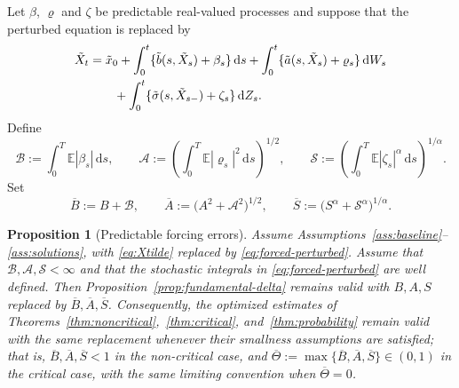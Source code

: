 \documentclass[10pt,a4paper]{amsart}
\newtheorem{proposition}[theorem]{Proposition}
\newcommand{\E}{\mathbb{E}}
\newcommand{\1}{\mathbf{1}}
\newcommand{\dd}{\,\mathrm{d}}
\newcommand{\wt}{\tilde}
\begin{document}
Let $\beta$, $\varrho$ and $\zeta$ be predictable real-valued processes and suppose that the perturbed equation is replaced by
\begin{align}
\wt X_t
&=\wt x_0+\int_0^t\{\wt b(s,\wt X_s)+\beta_s\}\dd s
+\int_0^t\{\wt a(s,\wt X_s)+\varrho_s\}\dd W_s \notag\\
&\qquad +\int_0^t\{\wt\sigma(s,\wt X_{s-})+\zeta_s\}\dd Z_s.
\label{eq:forced-perturbed}
\end{align}
Define
\[
  \mathcal B:=\int_0^T\E|\beta_s|\dd s,
  \qquad
  \mathcal A:=\left(\int_0^T\E|\varrho_s|^2\dd s\right)^{1/2},
  \qquad
  \mathcal S:=\left(\int_0^T\E|\zeta_s|^\alpha\dd s\right)^{1/\alpha}.
\]
Set
\[
  \overline B:=B+\mathcal B,
  \qquad
  \overline A:=\bigl(A^2+\mathcal A^2\bigr)^{1/2},
  \qquad
  \overline S:=\bigl(S^\alpha+\mathcal S^\alpha\bigr)^{1/\alpha}.
\]

\begin{proposition}[Predictable forcing errors]\label{prop:forcing}
Assume Assumptions~\ref{ass:baseline}--\ref{ass:solutions}, with \eqref{eq:Xtilde} replaced by \eqref{eq:forced-perturbed}. Assume that $\mathcal B,\mathcal A,\mathcal S<\infty$ and that the stochastic integrals in \eqref{eq:forced-perturbed} are well defined. Then Proposition~\ref{prop:fundamental-delta} remains valid with $B,A,S$ replaced by $\overline B,\overline A,\overline S$. Consequently, the optimized estimates of Theorems~\ref{thm:noncritical},~\ref{thm:critical}, and~\ref{thm:probability} remain valid with the same replacement whenever their smallness assumptions are satisfied; that is, $\overline B,\overline A,\overline S<1$ in the non-critical case, and $\overline\Theta:=\max\{\overline B,\overline A,\overline S\}\in(0,1)$ in the critical case, with the same limiting convention when $\overline\Theta=0$.
\end{proposition}
\end{document}
